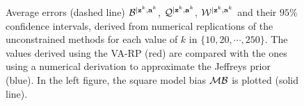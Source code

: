 \begin{figure}[h]
    \centering
    \caption{Average errors (dashed line) $\mathcal{B}^{|\mathbf{z}^k,\mathbf{a}^k}$, $\mathcal{Q}^{|\mathbf{z}^k,\mathbf{a}^k}$, $\mathcal{W}^{|\mathbf{z}^k,\mathbf{a}^k}$ and their $95\%$ confidence intervals, derived from numerical replications of the unconstrained methods for each value of $k$ in $\{10,20,\cdots,250\}$. The values derived 
    using the VA-RP (red) are compared with the ones 
    using a numerical derivation to approximate the Jeffreys prior (blue). In the left figure, the square model bias $\mathcal{M}\mathcal{B}$ is plotted (solid line).}
    \label{fig:errors-unconstrained}
\end{figure}




